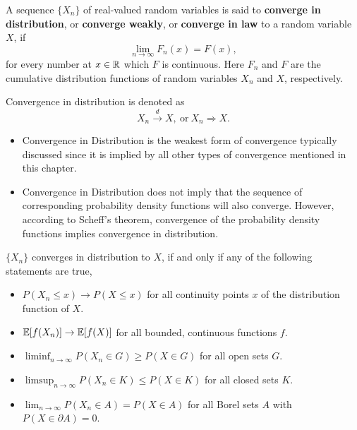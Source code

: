 \begin{definition}\label{def:convergence-in-distribution}
	A sequence \(\{X_n\}\) of real-valued random variables is said to \textbf{converge in distribution}, or \textbf{converge weakly}, or \textbf{converge in law} to a random variable \(X\), if
	\begin{equation}
		\lim_{n\to\infty}F_n(x)=F(x),
	\end{equation}
	for every number at \(x\in\mathbb{R}\) which \(F\) is continuous. Here \(F_n\) and \(F\) are the cumulative distribution functions of random variables \(X_n\) and \(X\), respectively.

	Convergence in distribution is denoted as
	\begin{equation}
		X_n \stackrel{d}{\rightarrow} X, \ \text{or}\  X_n \Rightarrow X.
	\end{equation}
\end{definition}

\begin{itemize}
	\item Convergence in Distribution is the weakest form of convergence typically discussed since it is implied by all other types of convergence mentioned in this chapter.
	\item Convergence in Distribution does not imply that the sequence of corresponding probability density functions will also converge. However, according to Scheff's theorem, convergence of the probability density functions implies convergence in distribution.
\end{itemize}

\begin{theorem}\label{thm:portmanteau-lemma}
	\(\{X_n\}\) converges in distribution to \(X\), if and only if any of the following statements are true,
	\begin{itemize}
		\item \(P(X_n \leq x) \to P(X \leq x)\) for all continuity points \(x\) of the distribution function of \(X\).
		\item \(\mathbb{E}[f(X_n)] \to \mathbb{E}[f(X)]\) for all bounded, continuous functions \(f\).
		\item \(\liminf_{n \to \infty} P(X_n \in G) \geq P(X \in G)\) for all open sets \(G\).
		\item \(\limsup_{n \to \infty} P(X_n \in K) \leq P(X \in K)\) for all closed sets \(K\).
		\item \(\lim_{n \to \infty} P(X_n \in A) = P(X \in A)\) for all Borel sets \(A\) with \(P(X \in \partial A) = 0\).
	\end{itemize}
\end{theorem}

